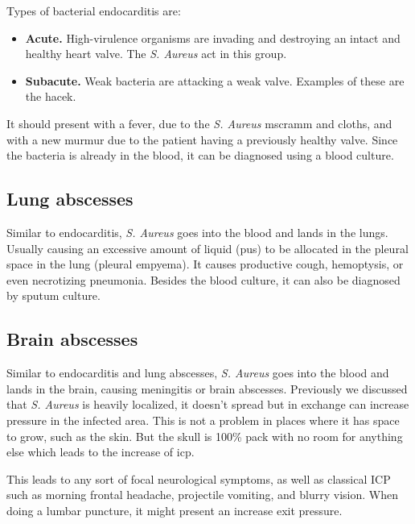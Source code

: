 Types of bacterial endocarditis are:

\begin{itemize}

    \item \textbf{Acute.} High-virulence organisms are invading and destroying an intact and healthy heart valve. The \textit{S. Aureus} act in this group.
    
    \item \textbf{Subacute.} Weak bacteria are attacking a weak valve. Examples of these are the \gls{hacek}.
    
\end{itemize}

It should present with a fever, due to the \textit{S. Aureus} \gls{mscramm} and cloths, and with a new murmur due to the patient having a previously healthy valve. Since the bacteria is already in the blood, it can be diagnosed using a blood culture.

\subsection{Lung abscesses}

Similar to endocarditis, \textit{S. Aureus} goes into the blood and lands in the lungs. Usually causing an excessive amount of liquid (pus) to be allocated in the pleural space in the lung (pleural empyema). It causes productive cough, hemoptysis, or even necrotizing pneumonia. Besides the blood culture, it can also be diagnosed by sputum culture.

\subsection{Brain abscesses}

Similar to endocarditis and lung abscesses, \textit{S. Aureus} goes into the blood and lands in the brain, causing meningitis or brain abscesses. Previously we discussed that \textit{S. Aureus} is heavily localized, it doesn't spread but in exchange can increase pressure in the infected area. This is not a problem in places where it has space to grow, such as the skin. But the skull is 100\% pack with no room for anything else which leads to the increase of \gls{icp}.

This leads to any sort of focal neurological symptoms, as well as classical ICP such as morning frontal headache, projectile vomiting, and blurry vision. When doing a lumbar puncture, it might present an increase exit pressure.

